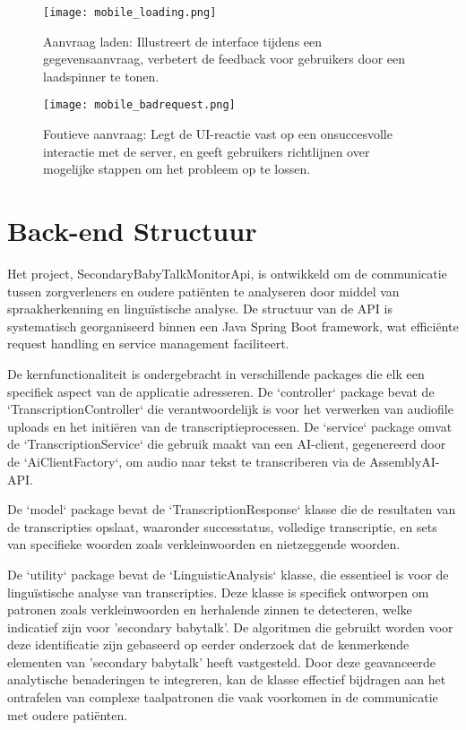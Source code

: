 \begin{figure}[h]
    \centering
    \texttt{[image: mobile\_loading.png]}
    \captionsetup{justification=centering}
    \caption{Aanvraag laden: Illustreert de interface tijdens een gegevensaanvraag, verbetert de feedback voor gebruikers door een laadspinner te tonen.}
    \label{fig:mobile_intro}
\end{figure}

\begin{figure}[h]
    \centering
    \texttt{[image: mobile\_badrequest.png]}
    \captionsetup{justification=centering}
    \caption{Foutieve aanvraag: Legt de UI-reactie vast op een onsuccesvolle interactie met de server, en geeft gebruikers richtlijnen over mogelijke stappen om het probleem op te lossen.}
    \label{fig:mobile_intro}
\end{figure}
\FloatBarrier 
\section{Back-end Structuur}
Het project, SecondaryBabyTalkMonitorApi, is ontwikkeld om de communicatie tussen zorgverleners en oudere patiënten te analyseren door middel van spraakherkenning en linguïstische analyse. De structuur van de API is systematisch georganiseerd binnen een Java Spring Boot framework, wat efficiënte request handling en service management faciliteert.

De kernfunctionaliteit is ondergebracht in verschillende packages die elk een specifiek aspect van de applicatie adresseren. De `controller` package bevat de `TranscriptionController` die verantwoordelijk is voor het verwerken van audiofile uploads en het initiëren van de transcriptieprocessen. De `service` package omvat de `TranscriptionService` die gebruik maakt van een AI-client, gegenereerd door de `AiClientFactory`, om audio naar tekst te transcriberen via de AssemblyAI-API.

De `model` package bevat de `TranscriptionResponse` klasse die de resultaten van de transcripties opslaat, waaronder successtatus, volledige transcriptie, en sets van specifieke woorden zoals verkleinwoorden en nietzeggende woorden.


De `utility` package bevat de `LinguisticAnalysis` klasse, die essentieel is voor de linguïstische analyse van transcripties. Deze klasse is specifiek ontworpen om patronen zoals verkleinwoorden en herhalende zinnen te detecteren, welke indicatief zijn voor 'secondary babytalk'. De algoritmen die gebruikt worden voor deze identificatie zijn gebaseerd op eerder onderzoek  \autocite{Sibian2024} dat de kenmerkende elementen van 'secondary babytalk' heeft vastgesteld. Door deze geavanceerde analytische benaderingen te integreren, kan de klasse effectief bijdragen aan het ontrafelen van complexe taalpatronen die vaak voorkomen in de communicatie met oudere patiënten.

